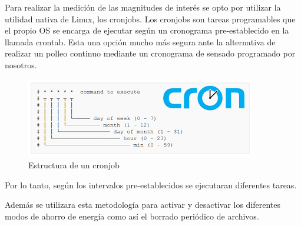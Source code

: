 Para realizar la medición de las magnitudes de interés se opto por utilizar la utilidad nativa de Linux, los cronjobs. Los cronjobs son tareas programables que el propio OS se encarga de ejecutar según un cronograma pre-establecido en la llamada crontab. Esta una opción mucho más segura ante la alternativa de realizar un polleo continuo mediante un cronograma de sensado programado por nosotros.
\begin{figure}[H]
	\centering
	\includegraphics[width=0.7\linewidth]{"../Ingenieria de Detalle/ImagenesIngenieria de Detalle/cron"}
	\caption{Estructura de un cronjob}
	\label{fig:cron}
\end{figure}

Por lo tanto, según los intervalos pre-establecidos se ejecutaran diferentes tareas.

Además se utilizara esta metodología para activar y desactivar los diferentes modos de ahorro de energía como así el borrado periódico de archivos.











